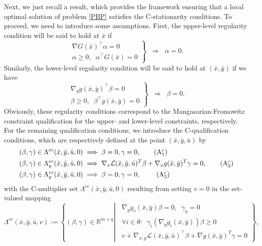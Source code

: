 Next, we just recall a result, which provides the framework ensuring that a local optimal solution of problem \eqref{PBP} satisfies the C-stationarity conditions. To proceed, we need to introduce some assumptions. First, the upper-level regularity condition will be said to hold at $\bar{x}$ if
\begin{equation}\label{UMFCQ}
\left.
\begin{array}{r}
\nabla G(\bar{x})^\top \alpha =0\\
\alpha\geq 0, \;\; \alpha^\top G(\bar{x})=0
\end{array}
\right\}
\;\; \Longrightarrow  \;\; \alpha =0.
\end{equation}
Similarly, the lower-level regularity condition will be said to hold at $(\bar{x},\bar{y})$ if we have
\begin{equation}\label{LMFCQ}
\left.
\begin{array}{r}
\nabla_y g(\bar{x},\bar{y})^\top \beta =0\\
\beta\geq 0, \;\; \beta^\top g(\bar{x},\bar{y})=0
\end{array}
\right\}
\;\; \Longrightarrow  \;\; \beta =0.
\end{equation}
Obviously, these regularity   {conditions} correspond to the Mangasarian-Fromowitz constraint qualification for the upper- and lower-level constraints, respectively.
For the remaining qualification conditions, we introduce the C-qualification conditions, which are respectively defined at the point $(\bar{x},\bar{y},\bar
{u})$ by 
\begin{align}
(\beta,\gamma)  &  \in\Lambda^{ec}(\bar{x},\bar{y},\bar{u},0)\implies
\beta=0,\gamma=0,\medskip \label{CQMM-1}\tag{A$_{1}^{c}$}\\
(\beta,\gamma)  &  \in\Lambda_{y}^{ec}(\bar{x},\bar{y},\bar{u},0)\implies
\nabla_{x}\mathcal{L}(\bar{x},\bar{y},\bar{u})^{T}\beta+\nabla_{x}g(\bar
{x},\bar{y})^{T}\gamma=0,\medskip  \label{CQMM-2}\tag{A$_{2}^{c}$}\\
(\beta,\gamma)  &  \in\Lambda_{y}^{ec}(\bar{x},\bar{y},\bar{u},0)\implies
\beta=0,\gamma=0,\text{ }  \label{CQMM-3}\tag{A$_{3}^{c}$}
\end{align}
with the C-multiplier set $\Lambda^{ec}(\bar{x},\bar{y},\bar{u},0)$ resulting from setting $v=0$ in the set-valued mapping
\begin{equation}\label{C-multipliers set}
\Lambda^{ec}(\bar{x},\bar{y},\bar{u},v) := \left\{(\beta,\gamma)\in\mathbb{R}^{m+q}\left|\;\;
\begin{array}{l}
\nabla_{y}g_{v}(\bar{x},\bar{y})\beta=0,\;\; \gamma_{\eta}=0\\[1ex]
\forall i\in\theta: \;\;\gamma_{i}(\nabla_{y}g_{i}(\bar{x},\bar{y}))\beta\geq 0\\[1ex]
v+\nabla_{x,y}\mathcal{L}(\bar{x},\bar{y},\bar{u})^\top
\beta+  {\nabla g(\bar{x},\bar{y})^{T}\gamma}=0
\end{array}
\right.\right\},
\end{equation}
